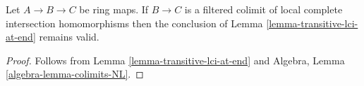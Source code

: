 \begin{lemma}
\label{lemma-transitive-colimit-lci-at-end}
Let $A \to B \to C$ be ring maps.
If $B \to C$ is a filtered colimit of local complete intersection
homomorphisms then the conclusion of
Lemma \ref{lemma-transitive-lci-at-end}
remains valid.
\end{lemma}

\begin{proof}
Follows from
Lemma \ref{lemma-transitive-lci-at-end}
and
Algebra, Lemma \ref{algebra-lemma-colimits-NL}.
\end{proof}
